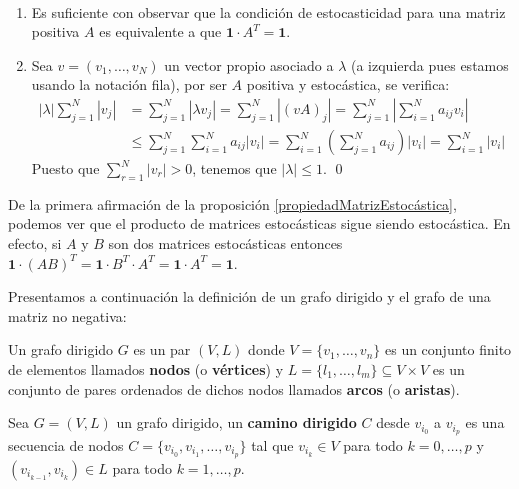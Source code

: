 \begin{proofs*}
\
\begin{enumerate}
    \item Es suficiente con observar que la condición de estocasticidad para una matriz positiva $A$ es equivalente a que $\mathbf{1}\cdot A^T=\mathbf{1}$.
    \item Sea $v=(v_1,\dots,v_N)$ un vector propio asociado a $\lambda$ (a izquierda pues estamos usando la notación fila), por ser $A$ positiva y estocástica, se verifica:
    \[
    \begin{aligned}
        \left|\lambda\right|\sum_{j=1}^N\left| v_j\right|&=\sum_{j=1}^N\left|\lambda v_j\right|= \sum_{j=1}^N\left|(vA)_j \right|  =\sum_{j=1}^N\left|\sum_{i=1}^N a_{ij}v_i\right|\\
        &\leq\sum_{j=1}^N\sum_{i=1}^N a_{ij}\left|v_i\right|=\sum_{i=1}^N\left( \sum_{j=1}^N a_{ij} \right) \left|v_i\right|=\sum_{i=1}^N\left|v_i\right|    
    \end{aligned}
    \]
    Puesto que $\displaystyle\sum_{r=1}^N\left|v_r\right|>0$, tenemos que $\left|\lambda\right|\leq1$.    \qed
\end{enumerate}
\end{proofs*}

\begin{remark*}\label{productoEstocásticos}
De la primera afirmación de la proposición \ref{propiedadMatrizEstocástica}, podemos ver que el producto de matrices estocásticas sigue siendo estocástica. En efecto, si $A$ y $B$ son dos matrices estocásticas entonces $\mathbf{1}\cdot\left(AB\right)^T=\mathbf{1}\cdot B^T\cdot A^T=\mathbf{1}\cdot A^T=\mathbf{1}$.
\end{remark*}

Presentamos a continuación la definición de un grafo dirigido y el grafo de una matriz no negativa:
\begin{definition}
    Un grafo dirigido $G$ es un par $(V,L)$ donde $V=\{v_1,\dots,v_n\}$ es un conjunto finito de elementos llamados \textbf{nodos} (o \textbf{vértices}) y $L=\{l_1,\dots,l_m\}\subseteq V\times V$ es un conjunto de pares ordenados de dichos nodos llamados \textbf{arcos} (o \textbf{aristas}).
\end{definition}

\begin{definition}
    Sea $G=(V,L)$ un grafo dirigido, un \textbf{camino dirigido} $C$ desde $v_{i_0}$ a $v_{i_p}$ es una secuencia de nodos $C=\{v_{i_0},v_{i_1}, \dots, v_{i_p}\}$ tal que $v_{i_k}\in V$ para todo $k=0,\dots,p$ y $(v_{i_{k-1}}, v_{i_k})\in L$ para todo $k=1,\dots,p$. 
\end{definition}

